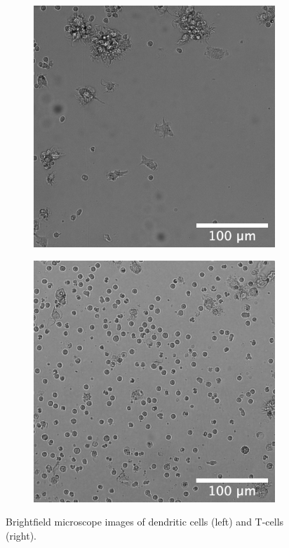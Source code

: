 \begin{figure}[h]
    \centering
    \begin{subfigure}[h!]{0.3\textwidth}
        \includegraphics[width=\textwidth]{dissertation/figures/example_DCs_CK19O21.png}
    \end{subfigure}
    \begin{subfigure}[h!]{0.3\textwidth}
        \includegraphics[width=\textwidth]{dissertation/figures/example_Tcells_CK22B12.png}
    \end{subfigure}
    \caption{Brightfield microscope images of dendritic cells (left) and T-cells (right).}
\end{figure}

